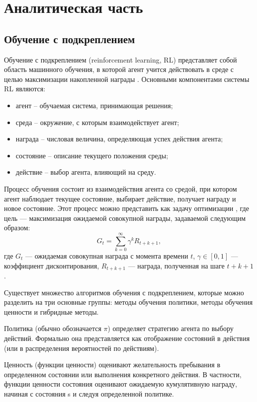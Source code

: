 \chapter{Аналитическая часть}

\section{Обучение с подкреплением}
Обучение с подкреплением (reinforcement learning, RL) представляет собой область машинного обучения, 
в которой агент учится действовать в среде с целью максимизации накопленной награды \cite{lib:rl}. 
Основными компонентами системы RL являются:
\begin{itemize}
    \item агент -- обучаемая система, принимающая решения;
    \item среда -- окружение, с которым взаимодействует агент;
    \item награда -- числовая величина, определяющая успех действия агента;
    \item состояние -- описание текущего положения среды;
    \item действие -- выбор агента, влияющий на среду.
\end{itemize}

Процесс обучения состоит из взаимодействия агента со средой, при котором агент наблюдает текущее состояние, 
выбирает действие, получает награду и новое состояние. 
Этот процесс можно представить как задачу оптимизации \cite{lib:rl}, где цель — максимизация ожидаемой совокупной награды, задаваемой следующим образом:
\begin{equation}
G_t = \sum_{k=0}^\infty \gamma^k R_{t+k+1},
\end{equation}
где $G_t$ — ожидаемая совокупная награда с момента времени $t$, $\gamma \in [0, 1]$ — коэффициент дисконтирования, $R_{t+k+1}$ — награда, полученная на шаге $t+k+1$.

Существует множество алгоритмов обучения с подкреплением, которые можно разделить на три основные группы: 
методы обучения политики, методы обучения ценности и гибридные методы. 

Политика (обычно обозначается $\pi$) определяет стратегию агента по выбору действий. 
Формально она представляется как отображение состояний в действия (или в распределения вероятностей по действиям).

Ценность (функции ценности) оценивают желательность пребывания в определенном состоянии или выполнения конкретного действия. 
В частности, функции ценности состояния оценивают ожидаемую кумулятивную награду, начиная с состояния s и следуя определенной политике.

